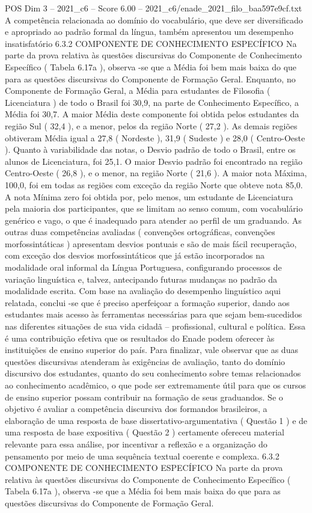 \begin{textsample}{POS Dim 3 – 2021\_c6 – Score 6.00 – 2021\_c6/enade\_2021\_filo\_baa597e9cf.txt}
A competência relacionada ao domínio do vocabulário, que deve ser diversificado e apropriado ao padrão formal da língua, também apresentou um desempenho insatisfatório 6.3.2 COMPONENTE DE CONHECIMENTO ESPECÍFICO Na parte da prova relativa às questões discursivas do Componente de Conhecimento Específico ( Tabela 6.17a ), observa -se que a Média foi bem mais baixa do que para as questões discursivas do Componente de Formação Geral.
Enquanto, no Componente de Formação Geral, a Média para estudantes de Filosofia ( Licenciatura ) de todo o Brasil foi 30,9, na parte de Conhecimento Específico, a Média foi 30,7.
A maior Média deste componente foi obtida pelos estudantes da região Sul ( 32,4 ), e a menor, pelos da região Norte ( 27,2 ).
As demais regiões obtiveram Média igual a 27,8 ( Nordeste ), 31,9 ( Sudeste ) e 28,0 ( Centro-Oeste ).
Quanto à variabilidade das notas, o Desvio padrão de todo o Brasil, entre os alunos de Licenciatura, foi 25,1.
O maior Desvio padrão foi encontrado na região Centro-Oeste ( 26,8 ), e o menor, na região Norte ( 21,6 ).
A maior nota Máxima, 100,0, foi em todas as regiões com exceção da região Norte que obteve nota 85,0.
A nota Mínima zero foi obtida por, pelo menos, um estudante de Licenciatura pela maioria dos participantes, que se limitam ao senso comum, com vocabulário genérico e vago, o que é inadequado para atender ao perfil de um graduando.
As outras duas competências avaliadas ( convenções ortográficas, convenções morfossintáticas ) apresentam desvios pontuais e são de mais fácil recuperação, com exceção dos desvios morfossintáticos que já estão incorporados na modalidade oral informal da Língua Portuguesa, configurando processos de variação linguística e, talvez, antecipando futuras mudanças no padrão da modalidade escrita.
Com base na avaliação do desempenho linguístico aqui relatada, conclui -se que é preciso aperfeiçoar a formação superior, dando aos estudantes mais acesso às ferramentas necessárias para que sejam bem-sucedidos nas diferentes situações de sua vida cidadã – profissional, cultural e política.
Essa é uma contribuição efetiva que os resultados do Enade podem oferecer às instituições de ensino superior do país.
Para finalizar, vale observar que as duas questões discursivas atenderam às exigências de avaliação, tanto do domínio discursivo dos estudantes, quanto do seu conhecimento sobre temas relacionados ao conhecimento acadêmico, o que pode ser extremamente útil para que os cursos de ensino superior possam contribuir na formação de seus graduandos.
Se o objetivo é avaliar a competência discursiva dos formandos brasileiros, a elaboração de uma resposta de base dissertativo-argumentativa ( Questão 1 ) e de uma resposta de base expositiva ( Questão 2 ) certamente ofereceu material relevante para essa análise, por incentivar a reflexão e a organização do pensamento por meio de uma sequência textual coerente e complexa. 6.3.2 COMPONENTE DE CONHECIMENTO ESPECÍFICO Na parte da prova relativa às questões discursivas do Componente de Conhecimento Específico ( Tabela 6.17a ), observa -se que a Média foi bem mais baixa do que para as questões discursivas do Componente de Formação Geral.

\end{textsample}
